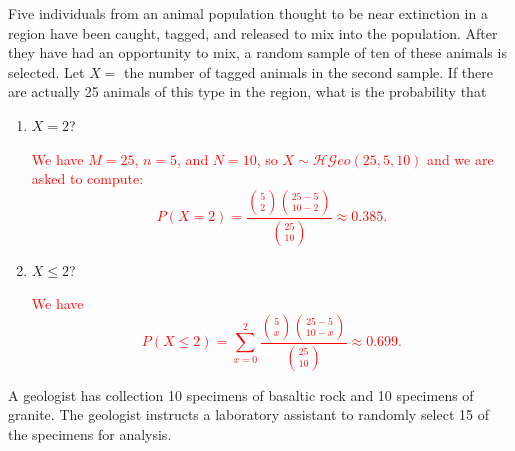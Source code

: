 \documentclass[12pt,reqno]{amsart}
\begin{document}
\bigskip
\prob Five individuals from an animal population thought to be near extinction in a region have been caught, tagged, and released to mix into the population. After they have had an opportunity to mix, a random sample of ten of these animals is selected. Let $X =$ the number of tagged animals in the second sample. If there are actually 25 animals of this type in the region, what is the probability that

\medskip
\begin{enumerate}
\item $X = 2$?

\bigskip
\textcolor{red}{We have $M=25$, $n=5$, and $N=10$, so $X\sim \mathcal{HG}eo(25, 5, 10)$ and we are asked to compute:
	\[P(X=2) = \frac{\binom{5}{2} \binom{25 - 5}{10-2}}{\binom{25}{10}} \approx 0.385.
	\]}
\bigskip

\item $X\leq2$?

\bigskip
\textcolor{red}{We have
	\[P(X\leq 2) = \sum_{x=0}^2 \frac{\binom{5}{x}\binom{25-5}{10-x}}{\binom{25}{10}} \approx 0.699.
	\]}
\end{enumerate}









\bigskip
\prob A geologist has collection 10 specimens of basaltic rock and 10 specimens of granite. The geologist instructs a laboratory assistant to randomly select 15 of the specimens for analysis.
\end{document}
